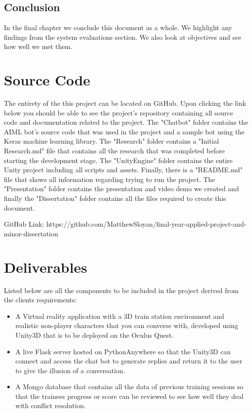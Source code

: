 \subsection{Conclusion}
In the final chapter we conclude this document as a whole. We highlight any findings from the system evaluations section. We also look at objectives and see how well we met them.

\section{Source Code}
The entirety of the this project can be located on GitHub. Upon clicking the link below you should be able to see the project's repository containing all source code and documentation related to the project. The "Chatbot" folder contains the AIML bot's source code that was used in the project and a sample bot using the Keras machine learning library. The "Research" folder contains a "Initial Research.md" file that contains all the research that was completed before starting the development stage. The "UnityEngine" folder contains the entire Unity project including all scripts and assets. Finally, there is a "README.md" file that shows all information regarding trying to run the project. The "Presentation" folder contains the presentation and video demo we created and finally the "Dissertation" folder contains all the files required to create this document.
\newline

GitHub Link: https://github.com/MatthewSloyan/final-year-applied-project-and-minor-dissertation

\section{Deliverables}
Listed below are all the components to be included in the project derived from the clients requirements:

\begin{itemize}
    \item A Virtual reality application with a 3D train station environment and realistic non-player characters that you can converse with, developed using Unity3D that is to be deployed on the Oculus Quest.
    
    \item A live Flask server hosted on PythonAnywhere so that the Unity3D can connect and access the chat bot to generate replies and return it to the user to give the illusion of a conversation.
    
    \item A Mongo database that contains all the data of previous training sessions so that the trainees progress or score can be reviewed to see how well they deal with conflict resolution. 
\end{itemize}
\newpage

